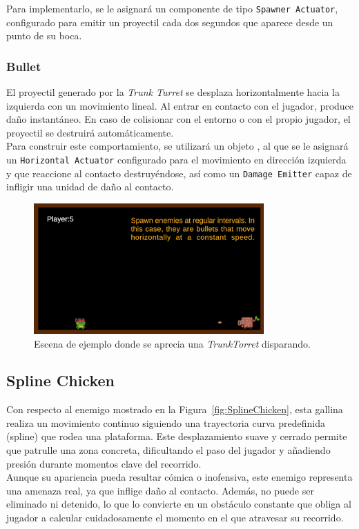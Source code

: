 Para implementarlo, se le asignará un componente de tipo \texttt{Spawner Actuator}, configurado para emitir un proyectil cada dos segundos que aparece desde un punto de su boca.
\subsubsection{Bullet}

El proyectil generado por la \textit{Trunk Turret} se desplaza horizontalmente hacia la izquierda con un movimiento lineal. Al entrar en contacto con el jugador, produce daño instantáneo. En caso de colisionar con el entorno o con el propio jugador, el proyectil se destruirá automáticamente.\\

Para construir este comportamiento, se utilizará un objeto , al que se le asignará un \texttt{Horizontal Actuator} configurado para el movimiento en dirección izquierda y que reaccione al contacto destruyéndose, así como un \texttt{Damage Emitter} capaz de infligir una unidad de daño al contacto. 


\begin{figure}[t]
	\centering
	\includegraphics[height=5cm]{Imagenes/TrunkTorret.png}
	\caption{Escena de ejemplo donde se aprecia una \textit{TrunkTorret} disparando.}
	\label{fig:TrunkTurret}
\end{figure}
\subsection{Spline Chicken}

Con respecto al enemigo mostrado en la Figura~\ref{fig:SplineChicken}, esta gallina realiza un movimiento continuo siguiendo una trayectoria curva predefinida (spline) que rodea una plataforma. Este desplazamiento suave y cerrado permite que patrulle una zona concreta, dificultando el paso del jugador y añadiendo presión durante momentos clave del recorrido.\\

Aunque su apariencia pueda resultar cómica o inofensiva, este enemigo representa una amenaza real, ya que inflige daño al contacto. Además, no puede ser eliminado ni detenido, lo que lo convierte en un obstáculo constante que obliga al jugador a calcular cuidadosamente el momento en el que atravesar su recorrido.\\

